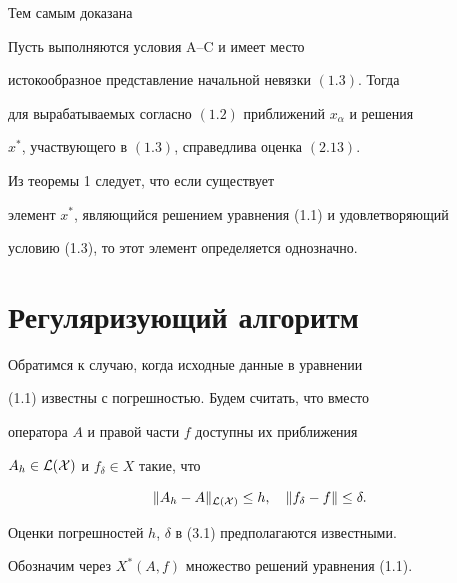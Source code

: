 Тем самым доказана 


 


\begin{thm} 


Пусть выполняются условия $\mathrm A$--$\mathrm C$ и имеет место 


истокообразное представление начальной невязки $(1.3)$. Тогда 


для вырабатываемых согласно $(1.2)$ приближений $x_\alpha$ и решения 


$x^*$, участвующего в $(1.3)$, справедлива оценка $(2.13)$. 


\end{thm} 


 


\begin{note} 


Из теоремы 1 следует, что если существует 


элемент $x^*$, являющийся решением уравнения (1.1) и удовлетворяющий 


условию (1.3), то этот элемент определяется однозначно. 


\end{note} 


 


\section{Регуляризующий алгоритм} 


 


Обратимся к случаю, когда исходные данные в уравнении 


(1.1) известны с погрешностью. Будем считать, что вместо 


оператора $A$ и правой части $f$ доступны их приближения 


$A_h\in\cal L(X)$ и $f_\delta\in X$ такие, что 


\begin{equation} 


\|A_h-A\|_{\cal L(X)}\le h,\quad 


\|f_\delta-f\|\le\delta. 


\end{equation} 


Оценки погрешностей $h$, $\delta$ в (3.1) предполагаются известными. 


Обозначим через $X^*(A,f)$ множество решений уравнения (1.1). 


